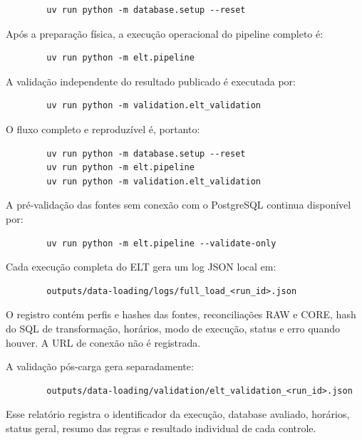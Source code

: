 \documentclass[12pt,a4paper]{article}
\begin{document}
	\begin{verbatim}
		uv run python -m database.setup --reset
	\end{verbatim}
	
	Após a preparação física, a execução operacional do pipeline completo é:
	
	\begin{verbatim}
		uv run python -m elt.pipeline
	\end{verbatim}
	
	A validação independente do resultado publicado é executada por:
	
	\begin{verbatim}
		uv run python -m validation.elt_validation
	\end{verbatim}
	
	O fluxo completo e reproduzível é, portanto:
	
	\begin{verbatim}
		uv run python -m database.setup --reset
		uv run python -m elt.pipeline
		uv run python -m validation.elt_validation
	\end{verbatim}
	
	A pré-validação das fontes sem conexão com o PostgreSQL continua disponível
	por:
	
	\begin{verbatim}
		uv run python -m elt.pipeline --validate-only
	\end{verbatim}
	
	Cada execução completa do ELT gera um log JSON local em:
	
	\begin{verbatim}
		outputs/data-loading/logs/full_load_<run_id>.json
	\end{verbatim}
	
	O registro contém perfis e hashes das fontes, reconciliações RAW e CORE, hash
	do SQL de transformação, horários, modo de execução, status e erro quando
	houver. A URL de conexão não é registrada.
	
	A validação pós-carga gera separadamente:
	
	\begin{verbatim}
		outputs/data-loading/validation/elt_validation_<run_id>.json
	\end{verbatim}
	
	Esse relatório registra o identificador da execução, database avaliado,
	horários, status geral, resumo das regras e resultado individual de cada
	controle.
	
\end{document}
